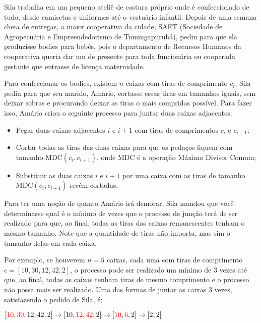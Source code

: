Sila trabalha em um pequeno ateliê de costura próprio onde é confeccionado de tudo, desde camisetas e uniformes até o vestuário infantil. Depois de uma semana cheia de entregas, a maior cooperativa da cidade, SAET (Sociedade de Agropecuária e Empreendedorismo de Tumingapurubá), pediu para que ela produzisse bodies para bebês, pois o departamento de Recursos Humanos da cooperativa queria dar um de presente para toda funcionária ou cooperada gestante que entrasse de licença maternidade. 

Para confeccionar os bodies, existem $n$ caixas com tiras de comprimento $c_i$. Sila pediu para que seu marido, Amário, cortasse essas tiras em tamanhos iguais, sem deixar sobras e procurando deixar as tiras o mais compridas possível. Para fazer isso, Amário criou o seguinte processo para juntar duas caixas adjacentes:

\begin{itemize}
    \item Pegar duas caixas adjacentes $i$ e $i+1$ com tiras de comprimentos $c_i$ e $c_{i+1}$;
    \item Cortar todas as tiras das duas caixas para que os pedaços fiquem com tamanho MDC$(c_i, c_{i+1})$, onde MDC é a operação Máximo Divisor Comum;
    \item Substituir as duas caixas $i$ e $i+1$ por uma caixa com as tiras de tamanho MDC$(c_i, c_{i+1})$ recém cortadas.
\end{itemize}

Para ter uma noção de quanto Amário irá demorar, Sila mandou que você determinasse qual é o mínimo de vezes que o processo de junção terá de ser realizado para que, ao final, todas as tiras das caixas remanescentes tenham o mesmo tamanho. Note que a quantidade de tiras não importa, mas sim o tamanho delas em cada caixa.

Por exemplo, se houverem $n=5$ caixas, cada uma com tiras de comprimento $c=[10,30,12,42,2]$, o processo pode ser realizado um mínimo de 3 vezes até que, ao final, todas as caixas tenham tiras de mesmo comprimento e o processo não possa mais ser realizado. Uma das formas de juntar as caixas 3 vezes, satisfazendo o pedido de Sila, é:

\begin{center}
    $[\textcolor{red}{10},\textcolor{red}{30},12,42,2] \rightarrow [10,\textcolor{red}{12},\textcolor{red}{42},2] \rightarrow [\textcolor{red}{10},\textcolor{red}{6},2] \rightarrow [2,2]$
\end{center}

